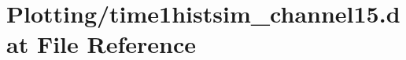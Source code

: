 \hypertarget{Plotting_2time1histsim__channel15_8dat}{}\section{Plotting/time1histsim\+\_\+channel15.dat File Reference}
\label{Plotting_2time1histsim__channel15_8dat}
